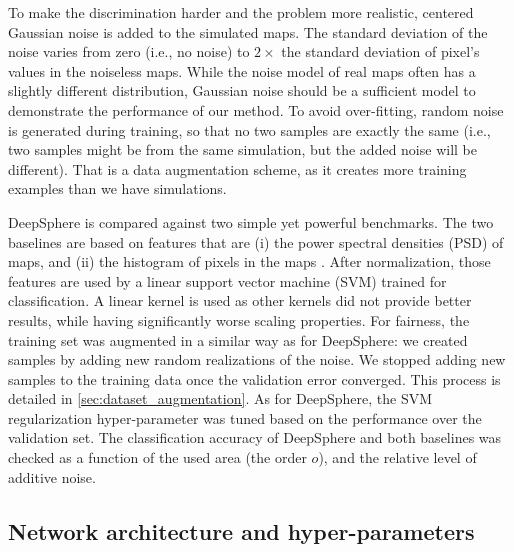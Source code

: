 \documentclass[final,twocolumn,3p,times,sort&compress]{elsarticle}
\newcommand{\1}{\b{1}}              %
\newcommand{\0}{\b{0}}              %
\begin{document}
To make the discrimination harder and the problem more realistic, centered Gaussian noise is added to the simulated maps.
The standard deviation of the noise varies from zero (i.e., no noise) to $2\times$ the standard deviation of pixel's values in the noiseless maps.
While the noise model of real maps often has a slightly different distribution, Gaussian noise should be a sufficient model to demonstrate the performance of our method.
To avoid over-fitting, random noise is generated during training, so that no two samples are exactly the same (i.e., two samples might be from the same simulation, but the added noise will be different).
That is a data augmentation scheme, as it creates more training examples than we have simulations.

DeepSphere is compared against two simple yet powerful benchmarks.
The two baselines are based on features that are (i) the power spectral densities (PSD) of maps, and (ii) the histogram of pixels in the maps \citep{patton2017cosmologicalconstraints}.
After normalization, those features are used by a linear support vector machine (SVM) trained for classification.
A linear kernel is used as other kernels did not provide better results, while having significantly worse scaling properties.
For fairness, the training set was augmented in a similar way as for DeepSphere: we created samples by adding new random realizations of the noise. We stopped adding new samples to the training data once the validation error converged. This process is detailed in \ref{sec:dataset_augmentation}.
As for DeepSphere, the SVM regularization hyper-parameter was tuned based on the performance over the validation set.
The classification accuracy of DeepSphere and both baselines was checked as a function of the used area (the order $o$), and the relative level of additive noise.

\subsection{Network architecture and hyper-parameters}
\end{document}
